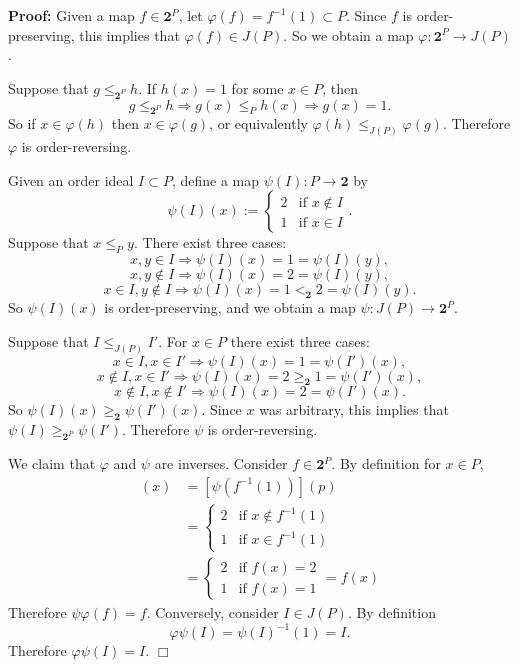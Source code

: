 \documentclass[11pt]{article}
\newenvironment{proof}{\noindent \textbf{Proof:}}{$\Box$}
\newcommand{\Bf}[1]{\textbf{#1}}
\newcommand{\imply}{\Longrightarrow}
\begin{document}
\begin{proof}
Given a map $f \in \Bf{2}^P$, let $\varphi(f)=f^{-1}(1) \subset P$. Since $f$ is order-preserving, this implies that $\varphi(f) \in J(P)$. So we obtain a map $\varphi: \Bf{2}^P \rightarrow J(P)$.

Suppose that $g \leq_{\Bf{2}^P} h$. If $h(x)=1$ for some $x \in P$, then $$g \leq_{\Bf{2}^P} h \Longrightarrow g(x) \leq_P h(x) \Longrightarrow g(x)=1.$$ So if $x \in \varphi(h)$ then $x \in \varphi(g)$, or equivalently $\varphi(h) \leq_{J(P)} \varphi(g)$. Therefore $\varphi$ is order-reversing.

Given an order ideal $I \subset P$, define a map $\psi(I):P \rightarrow \Bf{2}$ by $$\psi(I)(x):=\begin{cases} 2 & \text{if } x \notin I \\ 1 & \text{if } x \in I \end{cases}.$$ Suppose that $x \leq_P y$. There exist three cases: $$x,y \in I \imply \psi(I)(x) = 1 = \psi(I)(y),$$
$$x,y \notin I \imply \psi(I)(x) = 2 = \psi(I)(y),$$ $$x \in I, y \notin I \imply \psi(I)(x)=1 <_{\Bf{2}} 2=\psi(I)(y).$$ So $\psi(I)(x)$ is order-preserving, and we obtain a map $\psi: J(P) \rightarrow \Bf{2}^P$.

Suppose that $I \leq_{J(P)} I'$. For $x \in P$ there exist three cases: $$x \in I, x \in I' \imply \psi(I)(x)=1=\psi(I')(x),$$ $$x \notin I, x \in I' \imply \psi(I)(x)=2 \geq_{\Bf{2}} 1=\psi(I')(x),$$ $$x \notin I, x \notin I' \imply \psi(I)(x)=2=\psi(I')(x).$$ So $\psi(I)(x) \geq_{\Bf{2}} \psi(I')(x)$. Since $x$ was arbitrary, this implies that $\psi(I) \geq_{\Bf{2}^P} \psi(I')$. Therefore $\psi$ is order-reversing.

We claim that $\varphi$ and $\psi$ are inverses. Consider $f \in \Bf{2}^P$. By definition for $x \in P$,
\begin{align*}
[\psi \varphi(f)](x)&=[\psi(f^{-1}(1))](p) \\ &=\begin{cases} 2 &\text{if } x \notin f^{-1}(1) \\ 1 &\text{if } x \in f^{-1}(1) \end{cases} \\ &=\begin{cases} 2 &\text{if } f(x)=2 \\ 1 &\text{if } f(x)=1 \end{cases}=f(x)
\end{align*}
Therefore $\psi \varphi(f)=f$. Conversely, consider $I \in J(P)$. By definition $$\varphi \psi(I)=\psi(I)^{-1}(1)=I.$$ Therefore $\varphi \psi(I)=I$. \end{proof}
\end{document}
